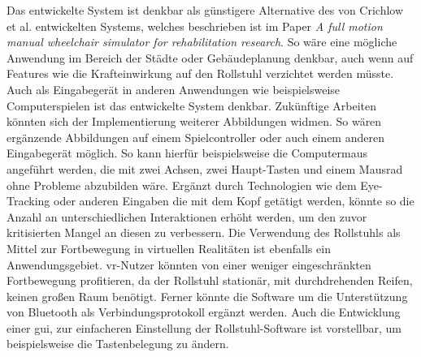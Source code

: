 Das entwickelte System ist denkbar als günstigere Alternative des von Crichlow et al. entwickelten Systems, welches beschrieben ist im Paper \textit{A full motion manual wheelchair simulator for rehabilitation research}\cite{crichlowFullMotionManual2011}.
So wäre eine mögliche Anwendung im Bereich der Städte oder Gebäudeplanung denkbar, auch wenn auf Features wie die Krafteinwirkung auf den Rollstuhl verzichtet werden müsste.
Auch als Eingabegerät in anderen Anwendungen wie beispielsweise Computerspielen ist das entwickelte System denkbar.
Zukünftige Arbeiten könnten sich der Implementierung weiterer Abbildungen widmen.
So wären ergänzende Abbildungen auf einem Spielcontroller oder auch einem anderen Eingabegerät möglich.
So kann hierfür beispielsweise die Computermaus angeführt werden, die mit zwei Achsen, zwei Haupt-Tasten und einem Mausrad ohne Probleme abzubilden wäre.
Ergänzt durch Technologien wie dem Eye-Tracking oder anderen Eingaben die mit dem Kopf getätigt werden, könnte so die Anzahl an unterschiedlichen Interaktionen erhöht werden, um den zuvor kritisierten Mangel an diesen zu verbessern.
Die Verwendung des Rollstuhls als Mittel zur Fortbewegung in virtuellen Realitäten ist ebenfalls ein Anwendungsgebiet.
\ac{vr}-Nutzer könnten von einer weniger eingeschränkten Fortbewegung profitieren, da der Rollstuhl stationär, mit durchdrehenden Reifen, keinen großen Raum benötigt.
Ferner könnte die Software um die Unterstützung von Bluetooth als Verbindungsprotokoll ergänzt werden.
Auch die Entwicklung einer \ac{gui}, zur einfacheren Einstellung der Rollstuhl-Software ist vorstellbar, um beispielsweise die Tastenbelegung zu ändern.